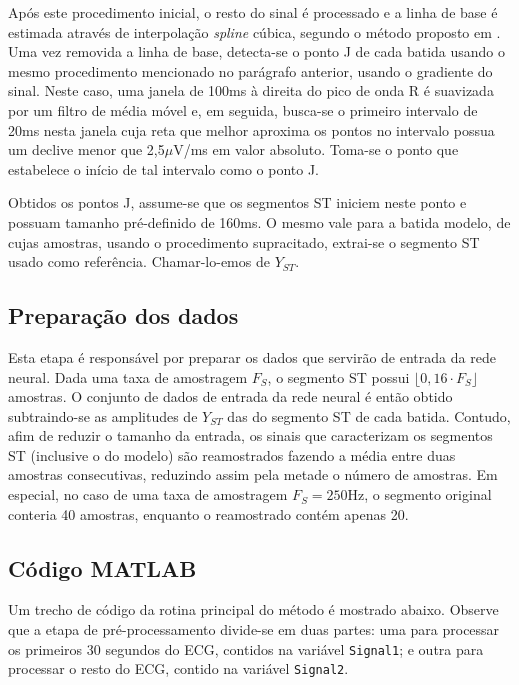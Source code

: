Após este procedimento inicial, o resto do sinal é processado e a linha de base é estimada através de interpolação \emph{spline} cúbica, segundo o método proposto em \cite{Badilini91}. Uma vez removida a linha de base, detecta-se o ponto J de cada batida usando o mesmo procedimento mencionado no parágrafo anterior, usando o gradiente do sinal. Neste caso, uma janela de 100ms à direita do pico de onda R é suavizada por um filtro de média móvel e, em seguida, busca-se o primeiro intervalo de 20ms nesta janela cuja reta que melhor aproxima os pontos no intervalo possua um declive menor que 2,5$\mu$V/ms em valor absoluto. Toma-se o ponto que estabelece o início de tal intervalo como o ponto J.

Obtidos os pontos J, assume-se que os segmentos ST iniciem neste ponto e possuam tamanho pré-definido de 160ms. O mesmo vale para a batida modelo, de cujas amostras, usando o procedimento supracitado, extrai-se o segmento ST usado como referência. Chamar-lo-emos de $Y_{ST}$.

\subsection{Preparação dos dados}
Esta etapa é responsável por preparar os dados que servirão de entrada da rede neural. Dada uma taxa de amostragem $F_S$, o segmento ST possui $\lfloor0,16\cdot F_S\rfloor$ amostras. O conjunto de dados de entrada da rede neural é então obtido subtraindo-se as amplitudes de $Y_{ST}$ das do segmento ST de cada batida. Contudo, afim de reduzir o tamanho da entrada, os sinais que caracterizam os segmentos ST (inclusive o do modelo) são reamostrados fazendo a média entre duas amostras consecutivas, reduzindo assim pela metade o número de amostras. Em especial, no caso de uma taxa de amostragem $F_S = 250\mathrm{Hz}$, o segmento original conteria 40 amostras, enquanto o reamostrado contém apenas 20.

\subsection{Código MATLAB}
Um trecho de código da rotina principal do método é mostrado abaixo. Observe que a etapa de pré-processamento divide-se em duas partes: uma para processar os primeiros 30 segundos do ECG, contidos na variável \texttt{Signal1}; e outra para processar o resto do ECG, contido na variável \texttt{Signal2}.


